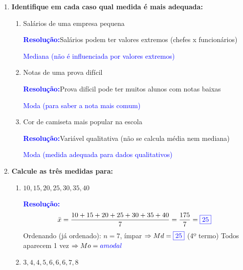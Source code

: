 \documentclass[11pt]{article}
\newcommand{\respostaNum}[1]{\textcolor{blue}{\boxed{#1}}}
\newcommand{\respostaTxt}[1]{\textcolor{blue}{#1}}
\newcommand{\resolucao}{\textbf{\textcolor{blue}{Resolução:}}}
\begin{document}
\begin{multicols}{2}
\begin{enumerate}[leftmargin=*]
\begin{enumerate}[label=\alph*)]
\resolucao
\[
\bar{x} = \frac{8 + 12 + 6 + 10 + 14}{5} = \frac{50}{5} = \respostaNum{10 \text{ pontos}}
\]

\item As idades de uma família: 12, 15, 18, 42, 45 anos. Encontre as 3 medidas.

\resolucao
\[
\bar{x} = \frac{12 + 15 + 18 + 42 + 45}{5} = \frac{132}{5} = \respostaNum{26,4 \text{ anos}}
\]
Ordenando: $12, 15, 18, 42, 45 \Rightarrow Md = \respostaNum{18 \text{ anos}}$
Frequências: todos aparecem 1 vez $\Rightarrow Mo = \respostaTxt{amodal}$
\end{enumerate}

\item \textbf{Identifique em cada caso qual medida é mais adequada:}

\begin{enumerate}[label=\alph*)]
\item Salários de uma empresa pequena

\resolucao Salários podem ter valores extremos (chefes x funcionários)

\respostaTxt{Mediana (não é influenciada por valores extremos)}

\item Notas de uma prova difícil

\resolucao Prova difícil pode ter muitos alunos com notas baixas

\respostaTxt{Moda (para saber a nota mais comum)}

\item Cor de camiseta mais popular na escola

\resolucao Variável qualitativa (não se calcula média nem mediana)

\respostaTxt{Moda (medida adequada para dados qualitativos)}
\end{enumerate}

\item \textbf{Calcule as três medidas para:}

\begin{enumerate}[label=\alph*)]
\item $10, 15, 20, 25, 30, 35, 40$

\resolucao
\[
\bar{x} = \frac{10+15+20+25+30+35+40}{7} = \frac{175}{7} = \respostaNum{25}
\]
Ordenando (já ordenado): $n = 7$, ímpar $\Rightarrow Md = \respostaNum{25}$ (4º termo)
Todos aparecem 1 vez $\Rightarrow Mo = \respostaTxt{amodal}$

\item $3, 4, 4, 5, 6, 6, 6, 7, 8$


\end{enumerate}
\end{enumerate}
\end{multicols}
\end{document}
